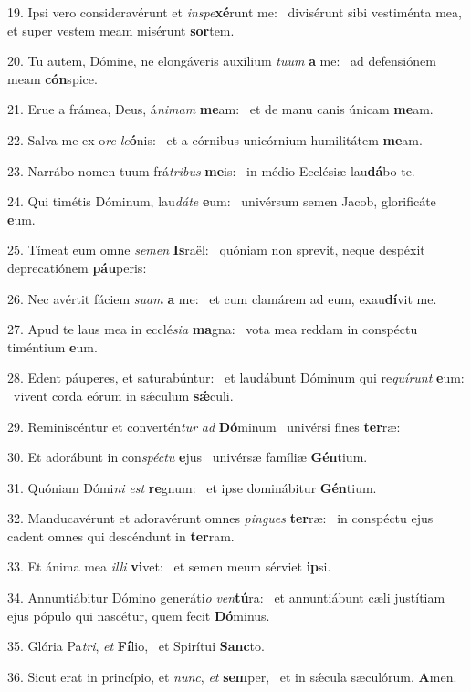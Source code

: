 19. Ipsi vero consideravérunt et \textit{in}\textit{spe}\textbf{xé}runt me: \ast\  divisérunt sibi vestiménta mea, et super vestem meam misérunt \textbf{sor}tem.\

20. Tu autem, Dómine, ne elongáveris auxílium \textit{tu}\textit{um} \textbf{a} me: \ast\  ad defensiónem meam \textbf{cón}spice.\

21. Erue a frámea, Deus, á\textit{ni}\textit{mam} \textbf{me}am: \ast\  et de manu canis únicam \textbf{me}am.\

22. Salva me ex o\textit{re} \textit{le}\textbf{ó}nis: \ast\  et a córnibus unicórnium humilitátem \textbf{me}am.\

23. Narrábo nomen tuum frá\textit{tri}\textit{bus} \textbf{me}is: \ast\  in médio Ecclésiæ lau\textbf{dá}bo te.\

24. Qui timétis Dóminum, lau\textit{dá}\textit{te} \textbf{e}um: \ast\  univérsum semen Jacob, glorificáte \textbf{e}um.\

25. Tímeat eum omne \textit{se}\textit{men} \textbf{Is}raël: \ast\  quóniam non sprevit, neque despéxit deprecatiónem \textbf{páu}peris:\

26. Nec avértit fáciem \textit{su}\textit{am} \textbf{a} me: \ast\  et cum clamárem ad eum, exau\textbf{dí}vit me.\

27. Apud te laus mea in ecclé\textit{si}\textit{a} \textbf{ma}gna: \ast\  vota mea reddam in conspéctu timéntium \textbf{e}um.\

28. Edent páuperes, et saturabúntur: \dag\  et laudábunt Dóminum qui re\textit{quí}\textit{runt} \textbf{e}um: \ast\  vivent corda eórum in sǽculum \textbf{sǽ}culi.\

29. Reminiscéntur et convertén\textit{tur} \textit{ad} \textbf{Dó}minum \ast\  univérsi fines \textbf{ter}ræ:\

30. Et adorábunt in con\textit{spéc}\textit{tu} \textbf{e}jus \ast\  univérsæ famíliæ \textbf{Gén}tium.\

31. Quóniam Dómi\textit{ni} \textit{est} \textbf{re}gnum: \ast\  et ipse dominábitur \textbf{Gén}tium.\

32. Manducavérunt et adoravérunt omnes \textit{pin}\textit{gues} \textbf{ter}ræ: \ast\  in conspéctu ejus cadent omnes qui descéndunt in \textbf{ter}ram.\

33. Et ánima mea \textit{il}\textit{li} \textbf{vi}vet: \ast\  et semen meum sérviet \textbf{ip}si.\

34. Annuntiábitur Dómino generáti\textit{o} \textit{ven}\textbf{tú}ra: \ast\  et annuntiábunt cæli justítiam ejus pópulo qui nascétur, quem fecit \textbf{Dó}minus.\

35. Glória Pa\textit{tri}, \textit{et} \textbf{Fí}lio, \ast\  et Spirítui \textbf{Sanc}to.\

36. Sicut erat in princípio, et \textit{nunc}, \textit{et} \textbf{sem}per, \ast\  et in sǽcula sæculórum. \textbf{A}men.\

